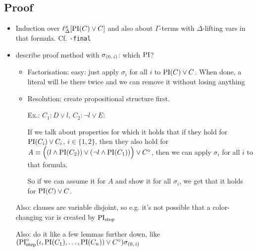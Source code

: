 \documentclass[,%
	draft=false,%
	numbers=noendperiod
	12pt,
	a4paper,
	oneside,%
	openany,
]{memoir}
\begin{document}
\subsection{ Proof}
\begin{itemize}
	\item Induction over $\ell_{\Delta}^{x}[\operatorname{PI}(C) \lor C]$ and also about $\Gamma$-terms with $\Delta$-lifting vars in that formula. Cf. \texttt{-final}

	\item {} describe proof method with $\sigma_{(0,\,i)}$: which $\operatorname{PI}$? 
		\begin{itemize}
			\item Factorisation:
				easy: just apply $\sigma_i$ for all $i$ to $\operatorname{PI}(C) \lor C$. 
				When done, a literal will be there twice and we can remove it without losing anything
			\item Resolution:
				create propositional structure first.

				Ex.: $C_1 : D \lor l$, $ C_2: \lnot l \lor E$:

				If we talk about properties for which it holds that if they hold for $\operatorname{PI}(C_i) \lor C_i$, $i\in\{1,2\}$, then they also hold for $ A \equiv \Big((l \land \operatorname{PI}(C_2)) \lor (\lnot l \land \operatorname{PI}(C_1))\Big) \lor C^\circ$, then we can apply $\sigma_i$ for all $i$ to that formula.

				So if we can assume it for $A$ and show it for all $\sigma_i$, we get that it holds for $\operatorname{PI}(C) \lor C$.

		\end{itemize}

		Also: clauses are variable disjoint, so e.g. it's not possible that a color-changing var is created by $\operatorname{PI}_{\mathrm{step}}$

		Also: do it like a few lemmas further down, like $(\operatorname{PI}^\circ_{\mathrm{step}}(\iota, \operatorname{PI}(C_1), \dots, \operatorname{PI}(C_n)) \lor C^\circ ) \sigma_{(0,\,i)}$
\end{itemize}
\end{document}
